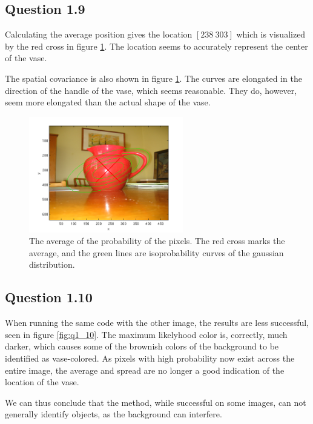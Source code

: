\documentclass[a4paper, 10pt, final]{article}
\begin{document}
\subsection*{Question 1.9}

Calculating the average position gives the location $[238~ 303]$ which is visualized by the red cross in figure \ref{fig:q1_9}.
The location seems to accurately represent the center of the vase.

The spatial covariance is also shown in figure \ref{fig:q1_9}.
The curves are elongated in the direction of the handle of the vase, which seems reasonable.
They do, however, seem more elongated than the actual shape of the vase.

\begin{figure}[!htpb]
  \centering
  \includegraphics[width=0.6\textwidth]{images/kande1.png}
  \caption{The average of the probability of the pixels. The red cross marks the average, and the green lines are isoprobability curves of the gaussian distribution.}
  \label{fig:q1_9}
\end{figure}

\subsection*{Question 1.10}

When running the same code with the other image, the results are less successful, seen in figure \ref{fig:q1_10}.
The maximum likelyhood color is, correctly, much darker, which causes some of the brownish colors of the background to be identified as vase-colored.
As pixels with high probability now exist across the entire image, the average and spread are no longer a good indication of the location of the vase.

We can thus conclude that the method, while successful on some images, can not generally identify objects, as the background can interfere.
\end{document}

